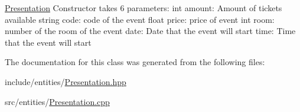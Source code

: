 \mbox{\hyperlink{class_presentation}{Presentation}} Constructor takes 6 parameters\+: int amount\+: Amount of tickets available string code\+: code of the event float price\+: price of event int room\+: number of the room of the event date\+: Date that the event will start time\+: Time that the event will start 

The documentation for this class was generated from the following files\+:\begin{DoxyCompactItemize}
\item 
include/entities/\mbox{\hyperlink{_presentation_8hpp}{Presentation.\+hpp}}\item 
src/entities/\mbox{\hyperlink{_presentation_8cpp}{Presentation.\+cpp}}\end{DoxyCompactItemize}
